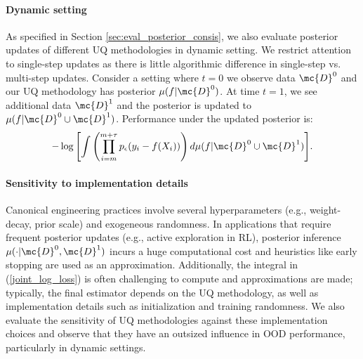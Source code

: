 




\paragraph{Dynamic setting} As specified in Section \ref{sec:eval_posterior_consis}, we  also evaluate posterior updates of different UQ methodologies in dynamic setting. We restrict attention to single-step updates as there is little algorithmic difference in single-step vs. multi-step updates.
Consider a setting where  $t=0$ we observe data $\mc{D}^0$ and our UQ methodology has posterior $\mu(f|\mc{D}^0)$.
At time $t = 1$, we see additional data $\mc{D}^1$ and
the posterior is updated to  $\mu(f|\mc{D}^0\cup \mc{D}^1)$. Performance under the updated posterior is:
\begin{align*}
    - \log {\left[\int \left(\prod_{i=m}^{m+\tau} p_\epsilon (y_i -f(X_i))\right) d\mu(f|\mc{D}^0 \cup \mc{D}^1) \right]}.
\end{align*}
 

\paragraph{Sensitivity to implementation details} Canonical engineering practices involve several hyperparameters (e.g., weight-decay, prior scale) and exogeneous randomness. In applications that require frequent posterior updates (e.g., active exploration in RL), posterior inference $\mu(\cdot | \mc{D}^0, \mc{D}^1)$ incurs a huge computational cost and heuristics like early stopping are used as an approximation. Additionally, the integral in (\ref{joint_log_loss}) is often challenging to compute and approximations are made; typically, the final estimator depends on the UQ methodology, as well as implementation details such as initialization and training randomness.  We also  evaluate the sensitivity of UQ methodologies against these implementation choices and observe that
they have an outsized influence in OOD performance, particularly in dynamic settings.




